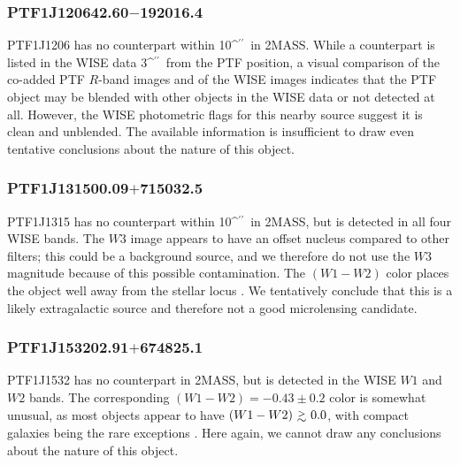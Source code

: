 \documentclass{emulateapj}
\newcommand{\gapprox }{{\lower0.8ex\hbox{$\buildrel >\over\sim$}}}
\def\asec{\ifmmode^{\prime\prime}\else$^{\prime\prime}$\fi}
\begin{document}
\subsubsection*{PTF1J120642.60$-$192016.4} %
PTF1J1206 has no counterpart within 10\asec\ in 2MASS. While a counterpart is listed in the WISE data 3\asec\ from the PTF position, a visual comparison of the co-added PTF $R$-band images and of the WISE images indicates that the PTF object may be blended with other objects in the WISE data or not detected at all. However, the WISE photometric flags for this nearby source suggest it is clean and unblended. The available information is insufficient to draw even tentative conclusions about the nature of this object.

\subsubsection*{PTF1J131500.09$+$715032.5} %
PTF1J1315 has no counterpart within 10\asec\ in 2MASS, but is detected in all four WISE bands. %
The $W3$ image appears to have an offset nucleus compared to other filters; this could be a background source, and we therefore do not use the $W3$ magnitude because of this possible contamination. The $(W1-W2)$ color places the object well away from the stellar locus \citep[cf.\ Figure 14 in][]{yan2013}. We tentatively conclude that this is a likely extragalactic source and therefore not a good microlensing candidate. 

\subsubsection*{PTF1J153202.91$+$674825.1} %
PTF1J1532 has no counterpart in 2MASS, but is detected in the WISE $W1$ and $W2$ bands. The corresponding $(W1-W2) = -0.43\pm0.2$ color is somewhat unusual, as most objects appear to have $(W1-W2)\ \gapprox\ 0.0$, with compact galaxies being the rare exceptions \citep[cf.\ Figure 14 in][]{yan2013}. Here again, we cannot draw any conclusions about the nature of this object. 
\end{document}
